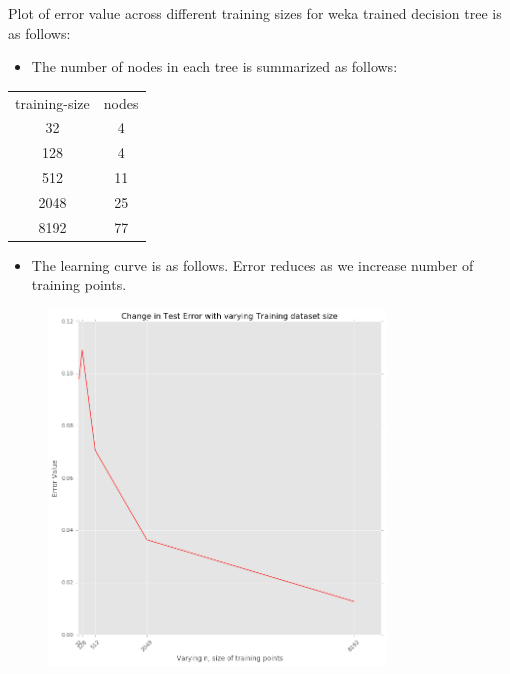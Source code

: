 \documentclass[a4paper]{article}
\theoremstyle{definition}
\newenvironment{soln}{
    \leavevmode\color{blue}\ignorespaces
}{}
\begin{document}
Plot of error value across different training sizes for weka trained decision tree is as follows:


\begin{soln}
	
	
\begin{itemize}
	\item The number of nodes in each tree is summarized as follows: 	
\end{itemize}
\begin{center}
	\begin{tabular}{ c c }
		training-size &  nodes \\
		32 &  4\\ 
		128 & 4 \\
		512 & 11 \\
		2048 & 25  \\
		8192 & 77
	\end{tabular}
\end{center}

\begin{itemize}
	\item The learning curve is as follows. Error reduces as we increase number of training points.
\end{itemize}

\begin{figure}[H]
	\centering
	\includegraphics[width=0.8\textwidth]{err_n_weka.png}
	\captionsetup{labelformat=empty}
	\caption{}
	\label{fig:my_label}
\end{figure}


\end{soln}
\end{document}

